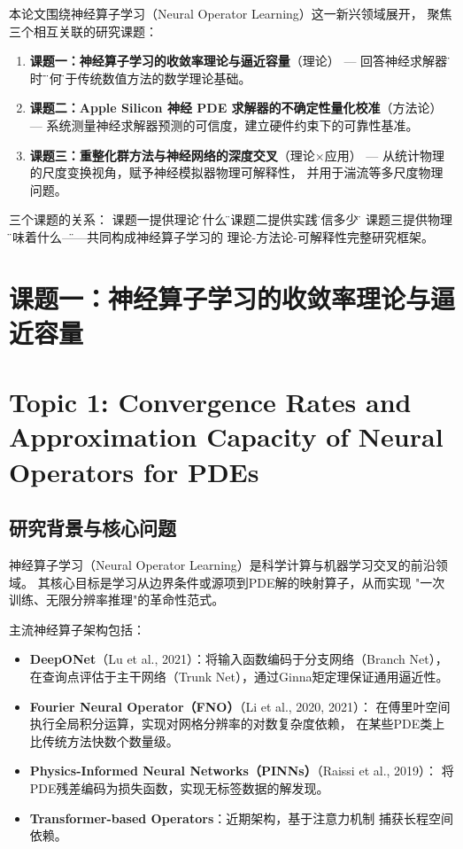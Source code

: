 \documentclass[12pt,a4paper,twoside]{article}
\begin{document}
本论文围绕神经算子学习（Neural Operator Learning）这一新兴领域展开，
聚焦三个相互关联的研究课题：

\begin{enumerate}
    \item \textbf{课题一：神经算子学习的收敛率理论与逼近容量}（理论）
        --- 回答神经求解器\"何时\"与\"为何\"优于传统数值方法的数学理论基础。

    \item \textbf{课题二：Apple Silicon 神经 PDE 求解器的不确定性量化校准}（方法论）
        --- 系统测量神经求解器预测的可信度，建立硬件约束下的可靠性基准。

    \item \textbf{课题三：重整化群方法与神经网络的深度交叉}（理论$\times$应用）
        --- 从统计物理的尺度变换视角，赋予神经模拟器物理可解释性，
        并用于湍流等多尺度物理问题。
\end{enumerate}

三个课题的关系：
课题一提供理论\"为什么\"，课题二提供实践\"可信多少\"，
课题三提供物理\"意味着什么\"——共同构成神经算子学习的
理论-方法论-可解释性完整研究框架。

\clearpage

\section{课题一：神经算子学习的收敛率理论与逼近容量}
\section*{Topic 1: Convergence Rates and Approximation Capacity of Neural Operators for PDEs}
\label{sec:topic1}

\subsection{研究背景与核心问题}

神经算子学习（Neural Operator Learning）是科学计算与机器学习交叉的前沿领域。
其核心目标是学习从边界条件或源项到PDE解的映射算子，从而实现
"一次训练、无限分辨率推理"的革命性范式。

主流神经算子架构包括：

\begin{itemize}
    \item \textbf{DeepONet}（Lu et al., 2021）：将输入函数编码于分支网络（Branch Net），
        在查询点评估于主干网络（Trunk Net），通过Ginna矩定理保证通用逼近性。
    \item \textbf{Fourier Neural Operator（FNO）}（Li et al., 2020, 2021）：
        在傅里叶空间执行全局积分运算，实现对网格分辨率的对数复杂度依赖，
        在某些PDE类上比传统方法快数个数量级。
    \item \textbf{Physics-Informed Neural Networks（PINNs）}（Raissi et al., 2019）：
        将PDE残差编码为损失函数，实现无标签数据的解发现。
    \item \textbf{Transformer-based Operators}：近期架构，基于注意力机制
        捕获长程空间依赖。
\end{itemize}
\end{document}
